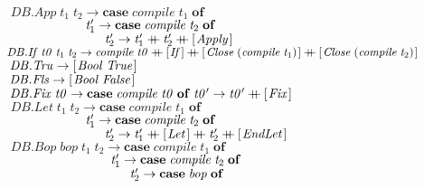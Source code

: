 \documentclass[10pt]{article}
\newcommand{\Conid}[1]{\mathit{#1}}
\newcommand{\Varid}[1]{\mathit{#1}}
\newcommand{\plus}{\mathbin{+\!\!\!+}}
\begin{document}
\begin{hscode}
${\phantom{\Varid{compile}\;\mbox{}}\Conid{\Conid{DB}.App}\;\Varid{t}_{1}\;\Varid{t}_{2}\to \mathbf{case}\;\Varid{compile}\;\Varid{t}_{1}\;\mathbf{of}}$\\
${\phantom{\Varid{compile}\;\mbox{}}\hskip6.00em\relax\Varid{t}_{1}'\to \mathbf{case}\;\Varid{compile}\;\Varid{t}_{2}\;\mathbf{of}}$\\
${\phantom{\Varid{compile}\;\mbox{}}\hskip6.00em\relax\hskip1.50em\relax\Varid{t}_{2}'\to \Varid{t}_{1}'\plus \Varid{t}_{2}'\plus [\mskip1.5mu \Conid{Apply}\mskip1.5mu]}$\\
${\phantom{\Varid{compile}\;\mbox{}}\Conid{\Conid{DB}.If}\;\Varid{t0}\;\Varid{t}_{1}\;\Varid{t}_{2}\to \Varid{compile}\;\Varid{t0}\plus [\mskip1.5mu \Conid{If}\mskip1.5mu]\plus [\mskip1.5mu \Conid{Close}\;(\Varid{compile}\;\Varid{t}_{1})\mskip1.5mu]\plus [\mskip1.5mu \Conid{Close}\;(\Varid{compile}\;\Varid{t}_{2})\mskip1.5mu]}$\\
${\phantom{\Varid{compile}\;\mbox{}}\Conid{\Conid{DB}.Tru}\to [\mskip1.5mu \Conid{Bool}\;\Conid{True}\mskip1.5mu]}$\\
${\phantom{\Varid{compile}\;\mbox{}}\Conid{\Conid{DB}.Fls}\to [\mskip1.5mu \Conid{Bool}\;\Conid{False}\mskip1.5mu]}$\\
${\phantom{\Varid{compile}\;\mbox{}}\Conid{\Conid{DB}.Fix}\;\Varid{t0}\to \mathbf{case}\;\Varid{compile}\;\Varid{t0}\;\mathbf{of}\;\Varid{t0'}\to \Varid{t0'}\plus [\mskip1.5mu \Conid{Fix}\mskip1.5mu]}$\\
${\phantom{\Varid{compile}\;\mbox{}}\Conid{\Conid{DB}.Let}\;\Varid{t}_{1}\;\Varid{t}_{2}\to \mathbf{case}\;\Varid{compile}\;\Varid{t}_{1}\;\mathbf{of}}$\\
${\phantom{\Varid{compile}\;\mbox{}}\hskip6.00em\relax\Varid{t}_{1}'\to \mathbf{case}\;\Varid{compile}\;\Varid{t}_{2}\;\mathbf{of}}$\\
${\phantom{\Varid{compile}\;\mbox{}}\hskip6.00em\relax\hskip1.50em\relax\Varid{t}_{2}'\to \Varid{t}_{1}'\plus [\mskip1.5mu \Conid{Let}\mskip1.5mu]\plus \Varid{t}_{2}'\plus [\mskip1.5mu \Conid{EndLet}\mskip1.5mu]}$\\
${}$\\
${\phantom{\Varid{compile}\;\mbox{}}\Conid{\Conid{DB}.Bop}\;\Varid{bop}\;\Varid{t}_{1}\;\Varid{t}_{2}\to \mathbf{case}\;\Varid{compile}\;\Varid{t}_{1}\;\mathbf{of}}$\\
${\phantom{\Varid{compile}\;\mbox{}}\hskip8.00em\relax\Varid{t}_{1}'\to \mathbf{case}\;\Varid{compile}\;\Varid{t}_{2}\;\mathbf{of}}$\\
${\phantom{\Varid{compile}\;\mbox{}}\hskip8.00em\relax\hskip1.50em\relax\Varid{t}_{2}'\to \mathbf{case}\;\Varid{bop}\;\mathbf{of}}$\\

\end{hscode}
\end{document}
